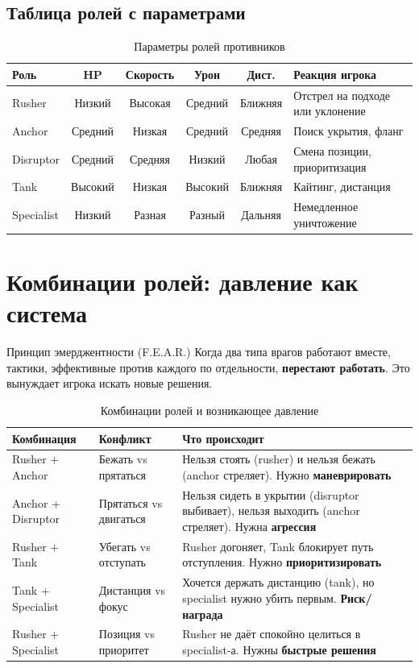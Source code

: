 \documentclass[a4paper,11pt]{report}
\begin{document}
\subsection{Таблица ролей с параметрами}

\begin{table}[H]
\centering
\caption{Параметры ролей противников}
\begin{tabularx}{\textwidth}{@{}l c c c c X@{}}
\toprule
\textbf{Роль} & \textbf{HP} & \textbf{Скорость} & \textbf{Урон} & \textbf{Дист.} & \textbf{Реакция игрока} \\
\midrule
Rusher & Низкий & Высокая & Средний & Ближняя & Отстрел на подходе или уклонение \\
Anchor & Средний & Низкая & Средний & Средняя & Поиск укрытия, фланг \\
Disruptor & Средний & Средняя & Низкий & Любая & Смена позиции, приоритизация \\
Tank & Высокий & Низкая & Высокий & Ближняя & Кайтинг, дистанция \\
Specialist & Низкий & Разная & Разный & Дальняя & Немедленное уничтожение \\
\bottomrule
\end{tabularx}
\end{table}

\section{Комбинации ролей: давление как система}

\begin{principle}{Принцип эмерджентности (F.E.A.R.)}
Когда два типа врагов работают вместе, тактики, эффективные
против каждого по отдельности, \textbf{перестают работать}.
Это вынуждает игрока искать новые решения.
\end{principle}

\begin{table}[H]
\centering
\caption{Комбинации ролей и возникающее давление}
\begin{tabularx}{\textwidth}{@{}l l X@{}}
\toprule
\textbf{Комбинация} & \textbf{Конфликт} & \textbf{Что происходит} \\
\midrule
Rusher + Anchor & Бежать vs прятаться & Нельзя стоять (rusher) и нельзя бежать (anchor стреляет). Нужно \textbf{маневрировать} \\
Anchor + Disruptor & Прятаться vs двигаться & Нельзя сидеть в укрытии (disruptor выбивает), нельзя выходить (anchor стреляет). Нужна \textbf{агрессия} \\
Rusher + Tank & Убегать vs отступать & Rusher догоняет, Tank блокирует путь отступления. Нужно \textbf{приоритизировать} \\
Tank + Specialist & Дистанция vs фокус & Хочется держать дистанцию (tank), но specialist нужно убить первым. \textbf{Риск/награда} \\
Rusher + Specialist & Позиция vs приоритет & Rusher не даёт спокойно целиться в specialist-а. Нужны \textbf{быстрые решения} \\
\bottomrule
\end{tabularx}
\end{table}
\end{document}
